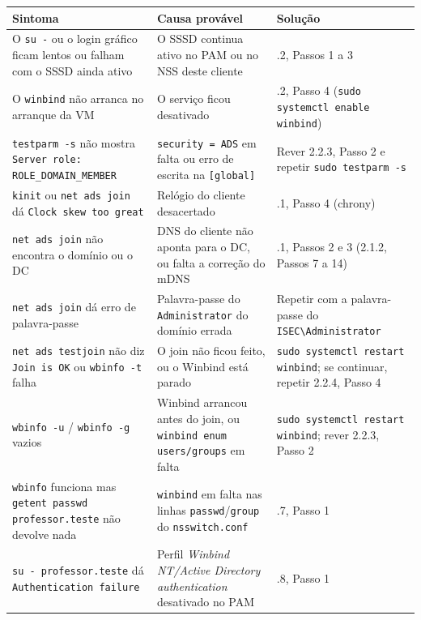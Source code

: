 \begin{center}\small
\begin{tabularx}{\linewidth}{|>{\raggedright\arraybackslash}X|>{\raggedright\arraybackslash}X|>{\raggedright\arraybackslash}X|}
\hline
\rowcolor{azul!10}\textbf{Sintoma} & \textbf{Causa provável} & \textbf{Solução} \\
\hline
O \texttt{su -} ou o login gráfico ficam lentos ou falham com o SSSD ainda ativo & O SSSD continua ativo no PAM ou no NSS deste cliente & 2.2.2, Passos 1 a 3 \\
\hline
O \texttt{winbind} não arranca no arranque da VM & O serviço ficou desativado & 2.2.2, Passo 4 (\texttt{sudo systemctl enable winbind}) \\
\hline
\texttt{testparm -s} não mostra \texttt{Server role: ROLE\_DOMAIN\_MEMBER} & \texttt{security = ADS} em falta ou erro de escrita na \texttt{[global]} & Rever 2.2.3, Passo 2 e repetir \texttt{sudo testparm -s} \\
\hline
\texttt{kinit} ou \texttt{net ads join} dá \texttt{Clock skew too great} & Relógio do cliente desacertado & 2.2.1, Passo 4 (chrony) \\
\hline
\texttt{net ads join} não encontra o domínio ou o DC & DNS do cliente não aponta para o DC, ou falta a correção do mDNS & 2.2.1, Passos 2 e 3 (2.1.2, Passos 7 a 14) \\
\hline
\texttt{net ads join} dá erro de palavra-passe & Palavra-passe do \texttt{Administrator} do domínio errada & Repetir com a palavra-passe do \texttt{ISEC\textbackslash{}Administrator} \\
\hline
\texttt{net ads testjoin} não diz \texttt{Join is OK} ou \texttt{wbinfo -t} falha & O join não ficou feito, ou o Winbind está parado & \texttt{sudo systemctl restart winbind}; se continuar, repetir 2.2.4, Passo 4 \\
\hline
\texttt{wbinfo -u} / \texttt{wbinfo -g} vazios & Winbind arrancou antes do join, ou \texttt{winbind enum users/\allowbreak{}groups} em falta & \texttt{sudo systemctl restart winbind}; rever 2.2.3, Passo 2 \\
\hline
\texttt{wbinfo} funciona mas \texttt{getent passwd professor.teste} não devolve nada & \texttt{winbind} em falta nas linhas \texttt{passwd}/\texttt{group} do \texttt{nsswitch.conf} & 2.2.7, Passo 1 \\
\hline
\texttt{su - professor.teste} dá \texttt{Authentication failure} & Perfil \emph{Winbind NT/Active Directory authentication} desativado no PAM & 2.2.8, Passo 1 \\

\end{tabularx}
\end{center}
